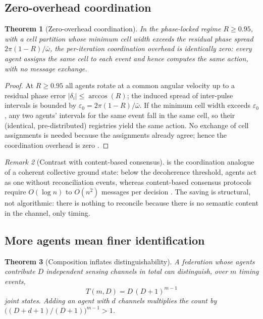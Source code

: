 \documentclass[11pt,twocolumn,a4paper]{article}
\theoremstyle{thmstyle}
\newtheorem{theorem}{Theorem}[section]
\theoremstyle{definition}
\theoremstyle{remark}
\newtheorem{remark}[theorem]{Remark}
\newcommand{\Rens}{R}
\newcommand{\eps}{\varepsilon}
\begin{document}
\subsection{Zero-overhead coordination}

\begin{theorem}[Zero-overhead coordination]
\label{thm:zero-overhead}
In the phase-locked regime $\Rens\ge0.95$, with a cell partition whose
minimum cell width exceeds the residual phase spread
$2\pi(1-\Rens)/\bar\omega$, the per-iteration coordination overhead is
identically zero: every agent assigns the same cell to each event and hence
computes the same action, with no message exchange.
\end{theorem}

\begin{proof}
At $\Rens\ge0.95$ all agents rotate at a common angular velocity up to a
residual phase error $|\delta_i|\le\arccos(\Rens)$; the induced spread of
inter-pulse intervals is bounded by $\eps_0=2\pi(1-\Rens)/\bar\omega$. If
the minimum cell width exceeds $\eps_0$, any two agents' intervals for the
same event fall in the same cell, so their (identical, pre-distributed)
registries yield the same action. No exchange of cell assignments is needed
because the assignments already agree; hence the coordination overhead is
zero \citep{lynch1996distributed}.
\end{proof}

\begin{remark}[Contrast with content-based consensus]
\label{rem:consensus}
 is the coordination analogue of a coherent
collective ground state: below the decoherence threshold, agents act as one
without reconciliation events, whereas content-based consensus protocols
require $O(\log n)$ to $O(n^2)$ messages per decision
\citep{lynch1996distributed}. The saving is structural, not algorithmic:
there is nothing to reconcile because there is no semantic content in the
channel, only timing.
\end{remark}

\subsection{More agents mean finer identification}

\begin{theorem}[Composition inflates distinguishability]
\label{thm:composition}
A federation whose agents contribute $D$ independent sensing channels in
total can distinguish, over $m$ timing events,
\[
T(m,D)=D\,(D+1)^{m-1}
\]
joint states. Adding an agent with $d$ channels multiplies the count by
$\bigl((D+d+1)/(D+1)\bigr)^{m-1}>1$.
\end{theorem}
\end{document}
